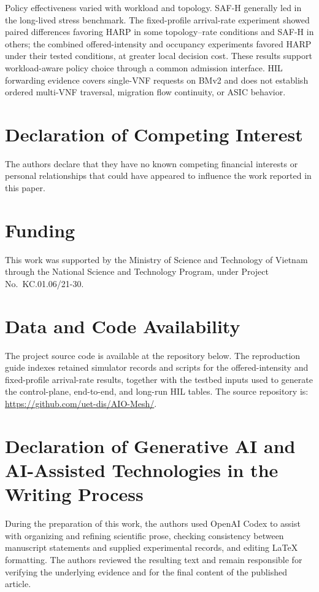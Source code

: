 \documentclass[final,5p]{elsarticle}
\newcommand{\rev}[1]{\textcolor{revisiongreen}{#1}}
\let\newrev\rev
\begin{document}
\newrev{Policy effectiveness varied with workload and topology. SAF-H generally led in the long-lived stress benchmark. The fixed-profile arrival-rate experiment showed paired differences favoring HARP in some topology--rate conditions and SAF-H in others; the combined offered-intensity and occupancy experiments favored HARP under their tested conditions, at greater local decision cost. These results support workload-aware policy choice through a common admission interface. HIL forwarding evidence covers single-VNF requests on BMv2 and does not establish ordered multi-VNF traversal, migration flow continuity, or ASIC behavior.}



\section*{Declaration of Competing Interest}
The authors declare that they have no known competing financial interests or personal relationships that could have appeared to influence the work reported in this paper.

\section*{Funding} 
\noindent This work was supported by the Ministry of Science and Technology of Vietnam through the National Science and Technology Program, under Project No.~KC.01.06/21-30.

\section*{Data and Code Availability}
\newrev{The project source code is available at the repository below. The reproduction guide indexes retained simulator records and scripts for the offered-intensity and fixed-profile arrival-rate results, together with the testbed inputs used to generate the control-plane, end-to-end, and long-run HIL tables. The source repository is:}
\url{https://github.com/uet-dis/AIO-Mesh/}.

\section*{Declaration of Generative AI and AI-Assisted Technologies in the Writing Process}
During the preparation of this work, the authors used OpenAI Codex to assist with organizing and refining scientific prose, checking consistency between manuscript statements and supplied experimental records, and editing LaTeX formatting. The authors reviewed the resulting text and remain responsible for verifying the underlying evidence and for the final content of the published article.
\end{document}
